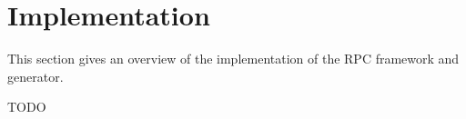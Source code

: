 \chapter{Implementation}
\label{Chapter5}

This section gives an overview of the implementation of the RPC framework and generator.

TODO


\newpage


\newpage


\newpage


\newpage


\newpage



\newpage

